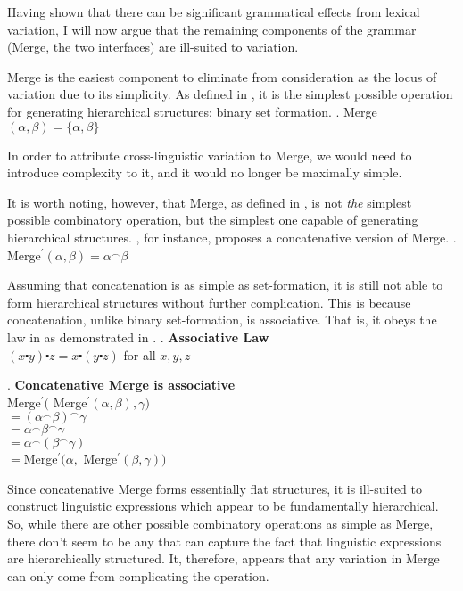Having shown that there can be significant grammatical effects from lexical variation, I will now argue that the remaining components of the grammar (Merge, the two interfaces) are ill-suited to variation.

Merge is the easiest component to eliminate from consideration as the locus of variation due to its simplicity.
As defined in \Next, it is the simplest possible operation for generating hierarchical structures: binary set formation.
\ex. Merge$(\alpha, \beta) = \{ \alpha, \beta\}$

In order to attribute cross-linguistic variation to Merge, we would need to introduce complexity to it, and it would no longer be maximally simple.

It is worth noting, however, that Merge, as defined in \Last, is not \textit{the} simplest possible combinatory operation, but the simplest one capable of generating hierarchical structures.
\textcite{hornstein2009theory}, for instance, proposes a concatenative version of Merge.
\ex. Merge$^\prime(\alpha, \beta) = \alpha^\frown\beta$

Assuming that concatenation is as simple as set-formation, it is still not able to form hierarchical structures without further complication.
This is because concatenation, unlike binary set-formation, is associative.
That is, it obeys the law in \Next as demonstrated in \NNext.
\ex. \textbf{Associative Law}\\
$(x \centerdot y) \centerdot z = x \centerdot (y \centerdot z)$ for all $x,y,z$

\ex. \textbf{Concatenative Merge is associative}\\
Merge$^\prime($ Merge$^\prime(\alpha, \beta), \gamma)$\\
$= (\alpha^\frown\beta)^\frown\gamma$\\
$= \alpha^\frown\beta^\frown\gamma$\\
$= \alpha^\frown(\beta^\frown\gamma)$\\
$= $Merge$^\prime(\alpha, $ Merge$^\prime(\beta, \gamma))$

Since concatenative Merge forms essentially flat structures, it is ill-suited to construct linguistic expressions which appear to be fundamentally hierarchical.
So, while there are other possible combinatory operations as simple as Merge, there don't seem to be any that can capture the fact that linguistic expressions are hierarchically structured.
It, therefore, appears that any variation in Merge can only come from complicating the operation.

